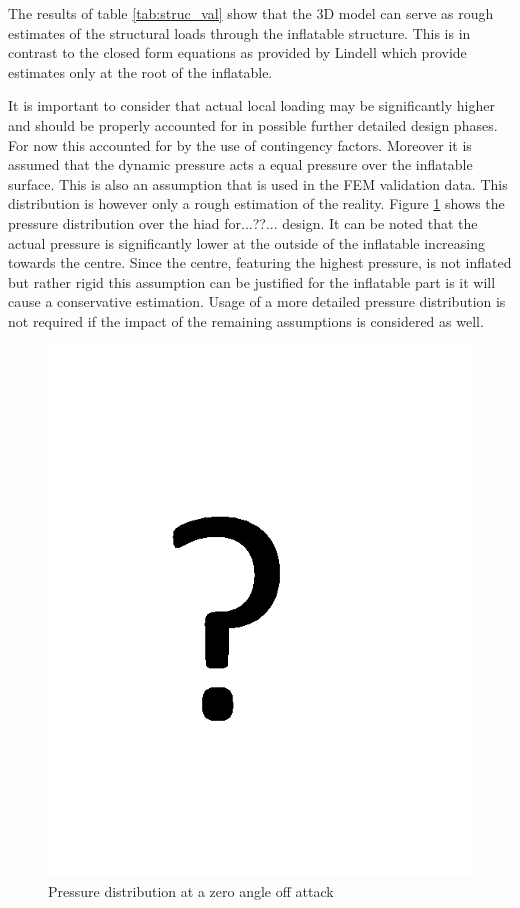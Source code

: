 The results of table \ref{tab:struc_val} show that the 3D model can serve as rough estimates of the structural loads through the inflatable structure. This is in contrast to the closed form equations as provided by Lindell\cite{Lindell2006} which provide estimates only at the root of the inflatable. 

It is important to consider that actual local loading may be significantly higher and should be properly accounted for in possible further detailed design phases. For now this accounted for by the use of contingency factors. Moreover it is assumed that the dynamic pressure acts a equal pressure over the inflatable surface. This is also an assumption that is used in the FEM validation data. This distribution is however only a rough estimation of the reality. Figure \ref{fig:struc_pres} shows the pressure distribution over the \gls{hiad} for...??... design. It can be noted that the actual pressure is significantly lower at the outside of the inflatable increasing towards the centre. Since the centre, featuring the highest pressure, is not inflated but rather rigid this assumption can be justified for the inflatable part is it will cause a conservative estimation. Usage of a more detailed pressure distribution is not required if the impact of the remaining assumptions is considered as well. 

\begin{figure}[b]
\centering
\includegraphics[width=1.0\textwidth]{./Figure/Structure/temp.png}
\caption{Pressure distribution at a zero angle off attack} 
\label{fig:struc_pres}
\end{figure}

